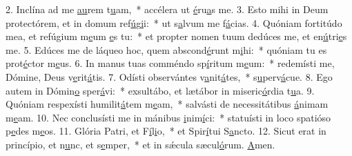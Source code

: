2. Inclína ad me \uline{au}rem t\uline{u}am,~* accélera ut \uline{é}ru\uline{a}s me.
3. Esto mihi in Deum protectórem, et in domum ref\uline{ú}g\uline{i}i:~* ut s\uline{a}lvum me f\uline{á}cias.
4. Quóniam fortitúdo mea, et refúgium m\uline{e}um \uline{e}s tu:~* et propter nomen tuum dedúces me, et en\uline{ú}tri\uline{e}s me.
5. Edúces me de láqueo hoc, quem abscond\uline{é}runt m\uline{i}hi:~* quóniam tu es prot\uline{é}ctor m\uline{e}us.
6. In manus tuas comméndo sp\uline{í}ritum m\uline{e}um:~* redemísti me, Dómine, Deus v\uline{e}rit\uline{á}tis.
7. Odísti observántes v\uline{a}nit\uline{á}tes,~* s\uline{u}perv\uline{á}cue.
8. Ego autem in Dómin\uline{o} sper\uline{á}vi:~* exsultábo, et lætábor in miseric\uline{ó}rdia t\uline{u}a.
9. Quóniam respexísti humilit\uline{á}tem m\uline{e}am,~* salvásti de necessitátibus \uline{á}nimam m\uline{e}am.
10. Nec conclusísti me in mánibus \uline{i}nim\uline{í}ci:~* statuísti in loco spatióso p\uline{e}des m\uline{e}os.
11. Glória Patri, et F\uline{í}l\uline{i}o,~* et Spir\uline{í}tui S\uline{a}ncto.
12. Sicut erat in princípio, et n\uline{u}nc, et s\uline{e}mper,~* et in sǽcula sæcul\uline{ó}rum. \uline{A}men.
